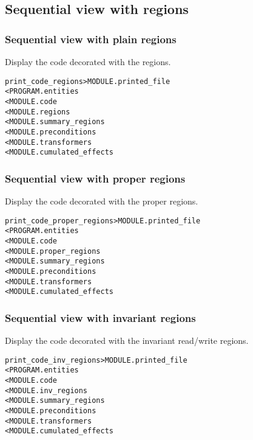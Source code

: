 \documentclass[a4paper]{report}
\newenvironment{PipsMake}{\begin{alltt}}{\end{alltt}}
\begin{document}
\subsection{Sequential view with regions}

\subsubsection{Sequential view with plain regions}
\label{sec:plain-regions}

Display the code decorated with the regions.

\begin{PipsMake}
print_code_regions              > MODULE.printed_file
        < PROGRAM.entities
        < MODULE.code
        < MODULE.regions
        < MODULE.summary_regions
        < MODULE.preconditions
        < MODULE.transformers
        < MODULE.cumulated_effects
\end{PipsMake}

\subsubsection{Sequential view with proper regions}

Display the code decorated with the proper regions.

\begin{PipsMake}
print_code_proper_regions              > MODULE.printed_file
        < PROGRAM.entities
        < MODULE.code
        < MODULE.proper_regions
        < MODULE.summary_regions
        < MODULE.preconditions
        < MODULE.transformers
        < MODULE.cumulated_effects
\end{PipsMake}


\subsubsection{Sequential view with invariant regions}

Display the code decorated with the invariant read/write regions.

\begin{PipsMake}
print_code_inv_regions              > MODULE.printed_file
        < PROGRAM.entities
        < MODULE.code
        < MODULE.inv_regions
        < MODULE.summary_regions
        < MODULE.preconditions
        < MODULE.transformers
        < MODULE.cumulated_effects
\end{PipsMake}
\end{document}
